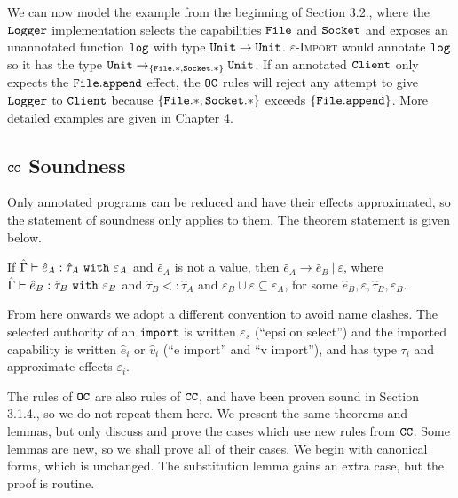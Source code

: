 We can now model the example from the beginning of Section 3.2., where the $\mathtt{Logger}$ implementation selects the capabilities $\mathtt{File}$ and $\mathtt{Socket}$ and exposes an unannotated function $\mathtt{log}$ with type $\mathtt{Unit} \rightarrow \mathtt{Unit}$. \textsc{$\varepsilon$-Import} would annotate $\mathtt{log}$ so it has the type $\mathtt{Unit} \rightarrow_{ \{ \mathtt{File.*, Socket.*} \} } \mathtt{Unit}$. If an annotated $\mathtt{Client}$ only expects the $\mathtt{File.append}$ effect, the $\mathtt{OC}$ rules will reject any attempt to give $\mathtt{Logger}$ to $\mathtt{Client}$ because $\mathtt{ \{ File.*, Socket.* \} }$ exceeds $ \mathtt{ \{File.append  \}}$. More detailed examples are given in Chapter 4.

\subsection{$\mathtt{CC}$ Soundness}

Only annotated programs can be reduced and have their effects approximated, so the statement of soundness only applies to them. The theorem statement is given below.

\begin{theorem}
If $\hat \Gamma \vdash \hat e_A: \hat \tau_A~\mathtt{with}~ \varepsilon_A$ and $\hat e_A$ is not a value, then $\hat e_A \longrightarrow \hat e_B~|~\varepsilon$, where $\hat \Gamma \vdash \hat e_B: \hat \tau_B~\mathtt{with}~ \varepsilon_B$ and $\hat \tau_B <: \hat \tau_A$ and $\varepsilon_B \cup \varepsilon \subseteq \varepsilon_A$, for some $\hat e_B, \varepsilon, \hat \tau_B, \varepsilon_B$.
\end{theorem}

From here onwards we adopt a different convention to avoid name clashes. The selected authority of an $\mathtt{import}$ is written $\varepsilon_{s}$ (``epsilon select'') and the imported capability is written $\hat e_i$ or $\hat v_i$ (``e import'' and ``v import''), and has type $\tau_i$ and approximate effects $\varepsilon_i$.

The rules of $\mathtt{OC}$ are also rules of $\mathtt{CC}$, and have been proven sound in Section 3.1.4., so we do not repeat them here. We present the same theorems and lemmas, but only discuss and prove the cases which use new rules from $\mathtt{CC}$. Some lemmas are new, so we shall prove all of their cases. We begin with canonical forms, which is unchanged. The substitution lemma gains an extra case, but the proof is routine.

